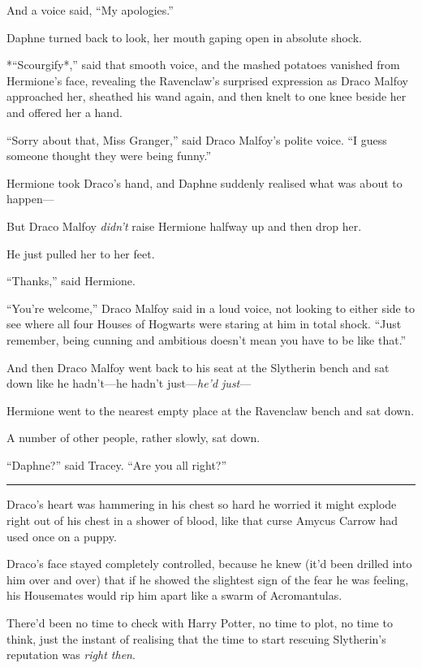 And a voice said, ``My apologies.''

Daphne turned back to look, her mouth gaping open in absolute shock.

*``Scourgify*,'' said that smooth voice, and the mashed potatoes
vanished from Hermione's face, revealing the Ravenclaw's surprised
expression as Draco Malfoy approached her, sheathed his wand again, and
then knelt to one knee beside her and offered her a hand.

``Sorry about that, Miss Granger,'' said Draco Malfoy's polite voice.
``I guess someone thought they were being funny.''

Hermione took Draco's hand, and Daphne suddenly realised what was about
to happen---

But Draco Malfoy \emph{didn't} raise Hermione halfway up and then drop
her.

He just pulled her to her feet.

``Thanks,'' said Hermione.

``You're welcome,'' Draco Malfoy said in a loud voice, not looking to
either side to see where all four Houses of Hogwarts were staring at him
in total shock. ``Just remember, being cunning and ambitious doesn't
mean you have to be like that.''

And then Draco Malfoy went back to his seat at the Slytherin bench and
sat down like he hadn't---he hadn't just---\emph{he'd just}---

Hermione went to the nearest empty place at the Ravenclaw bench and sat
down.

A number of other people, rather slowly, sat down.

``Daphne?'' said Tracey. ``Are you all right?''

\begin{center}\rule{3in}{0.4pt}\end{center}

Draco's heart was hammering in his chest so hard he worried it might
explode right out of his chest in a shower of blood, like that curse
Amycus Carrow had used once on a puppy.

Draco's face stayed completely controlled, because he knew (it'd been
drilled into him over and over) that if he showed the slightest sign of
the fear he was feeling, his Housemates would rip him apart like a swarm
of Acromantulas.

There'd been no time to check with Harry Potter, no time to plot, no
time to think, just the instant of realising that the time to start
rescuing Slytherin's reputation was \emph{right then}.

